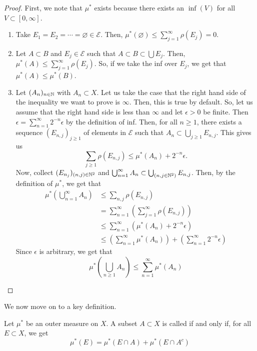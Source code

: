 \documentclass[11pt,leqno,oneside]{amsbook}
\numberwithin{thm}{section}
\newcommand{\Ep}{\mathcal{E}} %
\renewcommand{\emptyset}{\varnothing}
\begin{document}
\begin{proof}
  First, we note that $\mu^*$ exists because there exists an $\inf(V)$
  for all $V \subset [0,\infty]$.
  \begin{enumerate}
  \item Take $E_1 = E_2 = \cdots = \emptyset \in \Ep$. Then,
    $\mu^*(\emptyset) \leq \sum_{j=1}^\infty \rho(E_j) = 0$.
  \item Let $A \subset B$ and $E_j \in \Ep$ such that $A \subset B
    \subset \bigcup E_j$. Then, $\mu^*(A) \leq \sum_{j=1}^\infty \rho
    (E_j)$. So, if we take the inf over $E_j$, we get that $\mu^*(A)
    \leq \mu^*(B)$.
  \item Let $(A_n)_{n \in {\mathbb N}}$ with $A_n \subset X$. Let us take the
    case that the right hand side of the inequality we want to prove
    is $\infty$. Then, this is true by default. So, let us assume that
    the right hand side is less than $\infty$ and let $\epsilon > 0$
    be finite. Then $\epsilon = \sum_{n=1}^\infty 2^{-n} \epsilon$ by
    the definition of inf. Then, for all $n \geq 1$, there exists a
    sequence $(E_{n,j})_{j \geq 1}$ of elements in $\Ep$ such that
    $A_n \subset \bigcup_{j \geq 1} E_{n,j}$. This gives us \[
      \sum_{j \geq 1} \rho(E_{n,j}) \leq \mu^*(A_n) + 2^{-n} \epsilon.
    \]
    Now, collect $(E_{n_j})_{(n,j) \in {\mathbb N}^2}$ and
    $\bigcup_{n=1}^\infty A_n \subset \bigcup_{(n,j \in
      {\mathbb N}^2)}E_{n,j}$. Then, by the definition of $\mu^*$, we get that
    \begin{align*}
      \mu^*\left( \bigcup_{n=1}^\infty A_n \right) & \leq \sum_{n,j}
                                                     \rho(E_{n,j}) \\
      & = \sum_{n = 1}^\infty \left( \sum_{j=1}^\infty \rho(E_{n,j})
        \right) \\
      & \leq \sum_{n=1}^\infty \left( \mu^*(A_n) + 2^{-n} \epsilon
        \right) \\
      & \leq \left( \sum_{n=1}^\infty \mu^*(A_n) \right) + \left(
        \sum_{n=1}^\infty 2^{-n} \epsilon \right)
    \end{align*}
    Since $\epsilon$ is arbitrary, we get that \[
      \mu^*\left( \bigcup_{n \geq 1} A_n \right) \leq
      \sum_{n=1}^\infty \mu^*(A_n)
    \]
  \end{enumerate}
\end{proof}
We now move on to a key definition.
\begin{defn}[Carathéodory]
  Let $\mu^*$ be an outer measure on $X$. A subset $A \subset X$ is
  called  if and only if, for all $E \subset
  X$, we get \[
    \mu^*(E) = \mu^*(E \cap A) + \mu^*(E \cap A^c)
  \]
\end{defn}
\end{document}
